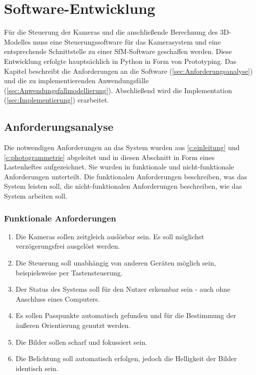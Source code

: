 \documentclass[./00PhotoBox.tex]{subfiles}
\begin{document}
\renewcommand{\itemautorefname}{Anforderung}

\chapter{Software-Entwicklung}
\label{c:software}

Für die Steuerung der Kameras und die anschließende Berechnung des 3D-Modelles muss eine Steuerungssoftware für das Kamerasystem und eine entsprechende Schnittstelle zu einer SfM-Software geschaffen werden. Diese Entwicklung erfolgte hauptsächlich in Python in Form von Prototyping. Das Kapitel beschreibt die Anforderungen an die Software (\autoref{sec:Anforderungsanalyse}) und die zu implementierenden Anwendungsfälle (\autoref{sec:Anwendungsfallmodellierung}). Abschließend wird die Implementation (\autoref{sec:Implementierung}) erarbeitet.

\section{Anforderungsanalyse}
\label{sec:Anforderungsanalyse}

Die notwendigen Anforderungen an das System wurden aus \autoref{c:einleitung} und \ref{c:photogrammetrie} abgeleitet und in diesen Abschnitt in Form eines Lastenheftes aufgezeichnet. Sie wurden in funktionale und nicht-funktionale Anforderungen unterteilt. Die funktionalen Anforderungen beschreiben, was das System leisten soll, die nicht-funktionalen Anforderungen beschreiben, wie das System arbeiten soll. 


\subsection{Funktionale Anforderungen}
\begin{enumerate}[label=F\arabic*]
  \item \label{e:zeitgleich} Die Kameras sollen zeitgleich auslösbar sein. Es soll möglichst ver\-zögerungs\-frei ausgelöst werden.
  \item \label{e:button} Die Steuerung soll unabhängig von anderen Geräten möglich sein, beispielsweise per Tastensteuerung.
  \item \label{e:status} Der Status des Systems soll für den Nutzer erkennbar sein - auch ohne Anschluss eines Computers.
  \item \label{e:passpunkte} Es sollen Passpunkte automatisch gefunden und für die Bestimmung der äußeren Orientierung genutzt werden.
  \item \label{e:scharf} Die Bilder sollen scharf und fokussiert sein.
  \item \label{e:licht} Die Belichtung soll automatisch erfolgen, jedoch die Helligkeit der Bilder identisch sein.
\end{enumerate}
\end{document}
